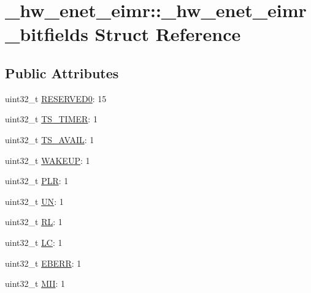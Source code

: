 \hypertarget{struct__hw__enet__eimr_1_1__hw__enet__eimr__bitfields}{}\section{\+\_\+hw\+\_\+enet\+\_\+eimr\+:\+:\+\_\+hw\+\_\+enet\+\_\+eimr\+\_\+bitfields Struct Reference}
\label{struct__hw__enet__eimr_1_1__hw__enet__eimr__bitfields}
\subsection*{Public Attributes}
\begin{DoxyCompactItemize}
\item 
uint32\+\_\+t \hyperlink{struct__hw__enet__eimr_1_1__hw__enet__eimr__bitfields_a71b43a962f45925937f41219677af855}{R\+E\+S\+E\+R\+V\+E\+D0}\+: 15
\item 
uint32\+\_\+t \hyperlink{struct__hw__enet__eimr_1_1__hw__enet__eimr__bitfields_a1060076fd43dcb7a3886087965d74ddf}{T\+S\+\_\+\+T\+I\+M\+ER}\+: 1
\item 
uint32\+\_\+t \hyperlink{struct__hw__enet__eimr_1_1__hw__enet__eimr__bitfields_afc167876c01eecac935a08f06234bae3}{T\+S\+\_\+\+A\+V\+A\+IL}\+: 1
\item 
uint32\+\_\+t \hyperlink{struct__hw__enet__eimr_1_1__hw__enet__eimr__bitfields_a0258a346fe2d4ee3c0eb06d996a9e8b2}{W\+A\+K\+E\+UP}\+: 1
\item 
uint32\+\_\+t \hyperlink{struct__hw__enet__eimr_1_1__hw__enet__eimr__bitfields_a42aa961562e42d66112bc0666df06a00}{P\+LR}\+: 1
\item 
uint32\+\_\+t \hyperlink{struct__hw__enet__eimr_1_1__hw__enet__eimr__bitfields_aadecff92067ceebca0bc05f89baae3eb}{UN}\+: 1
\item 
uint32\+\_\+t \hyperlink{struct__hw__enet__eimr_1_1__hw__enet__eimr__bitfields_a3493a43924bb140a7d7bd356a8ac1fd0}{RL}\+: 1
\item 
uint32\+\_\+t \hyperlink{struct__hw__enet__eimr_1_1__hw__enet__eimr__bitfields_afdc33a205d2f5df51e46e453d8649cbc}{LC}\+: 1
\item 
uint32\+\_\+t \hyperlink{struct__hw__enet__eimr_1_1__hw__enet__eimr__bitfields_aefededf8adbb7ec7bf0ab214083b6be0}{E\+B\+E\+RR}\+: 1
\item 
uint32\+\_\+t \hyperlink{struct__hw__enet__eimr_1_1__hw__enet__eimr__bitfields_a34c8a922424c0d58a2f302d878bc17aa}{M\+II}\+: 1

\end{DoxyCompactItemize}
